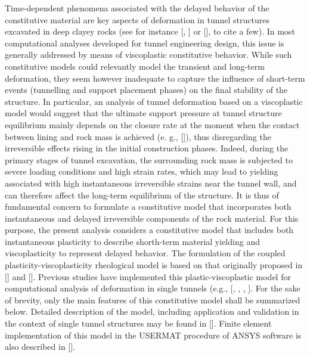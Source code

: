 \documentclass[a4paper,fleqn]{cas-sc}
\begin{document}
Time-dependent phenomena associated with the delayed behavior of the constitutive material are key aspects of deformation in tunnel structures excavated in deep clayey rocks (see for instance [, ] or [], to cite a few). In most computational analyses developed for tunnel engineering design, this issue is generally addressed by means of viscoplastic constitutive behavior. While such constitutive models could relevantly model the transient and long-term deformation, they seem however inadequate to capture the influence of short-term events (tunnelling and support placement phases) on the final stability of the structure. In particular, an analysis of tunnel deformation based on a viscoplastic model would suggest that the ultimate support pressure at tunnel structure equilibrium mainly depends on the closure rate at the moment when the contact between lining and rock mass is achieved (e. g., []), thus disregarding the irreversible effects rising in the initial construction phases. Indeed, during the primary stages of tunnel excavation, the surrounding rock mass is subjected to severe loading conditions and high strain rates, which may lead to yielding associated with high instantaneous irreversible strains near the tunnel wall, and can therefore affect the long-term equilibrium of the structure. It is thus of fundamental concern to formulate a constitutive model that incorporates both instantaneous and delayed irreversible components of the rock material. For this purpose, the present analysis considers a constitutive model that includes both instantaneous plasticity to describe shorth-term material yielding and viscoplasticity to represent delayed behavior. The formulation of the coupled plasticity-viscoplasticity rheological model is based on that originally proposed in [] and []. Previous studies have implemented this plastic-viscoplastic model for computational analysis of deformation in single tunnels (e.g., [, , , ]. For the sake of brevity, only the main features of this constitutive model shall be summarized below.  Detailed description of the model, including application and validation in the context of single tunnel structures may be found in []. Finite element implementation of this model in the USERMAT procedure of  ANSYS software is also described in [].
\end{document}
